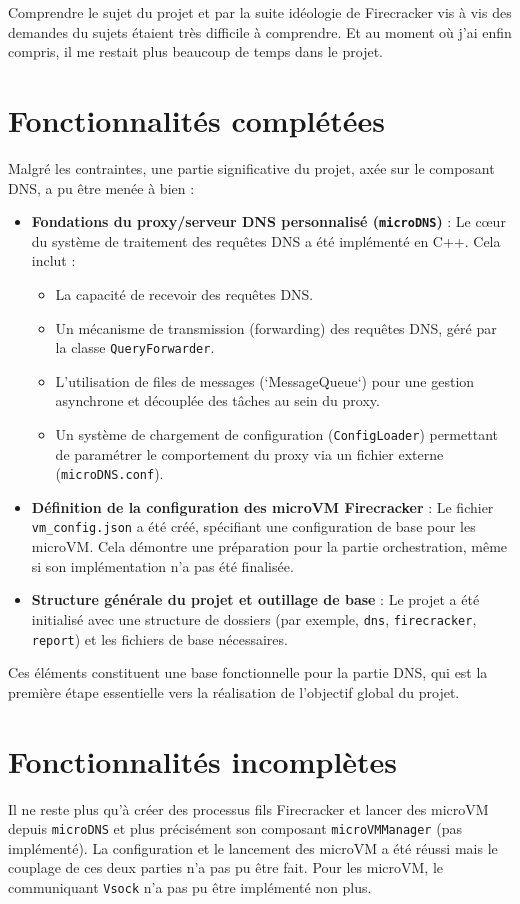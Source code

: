 \documentclass[12pt]{article}
\begin{document}
Comprendre le sujet du projet et par la suite idéologie de Firecracker vis à vis des demandes du sujets étaient très difficile à comprendre. Et au moment où j'ai enfin compris, il me restait plus beaucoup de temps dans le projet.

\section{Fonctionnalités complétées}
Malgré les contraintes, une partie significative du projet, axée sur le composant DNS, a pu être menée à bien :

\begin{itemize}
    \item \textbf{Fondations du proxy/serveur DNS personnalisé (\texttt{microDNS})} : Le cœur du système de traitement des requêtes DNS a été implémenté en C++. Cela inclut :
        \begin{itemize}
            \item La capacité de recevoir des requêtes DNS.
            \item Un mécanisme de transmission (forwarding) des requêtes DNS, géré par la classe \texttt{QueryForwarder}.
            \item L'utilisation de files de messages (`MessageQueue`) pour une gestion asynchrone et découplée des tâches au sein du proxy.
            \item Un système de chargement de configuration (\texttt{ConfigLoader}) permettant de paramétrer le comportement du proxy via un fichier externe (\texttt{microDNS.conf}).
        \end{itemize}
    \item \textbf{Définition de la configuration des microVM Firecracker} : Le fichier \texttt{vm\_config.json} a été créé, spécifiant une configuration de base pour les microVM. Cela démontre une préparation pour la partie orchestration, même si son implémentation n'a pas été finalisée.
    \item \textbf{Structure générale du projet et outillage de base} : Le projet a été initialisé avec une structure de dossiers (par exemple, \texttt{dns}, \texttt{firecracker}, \texttt{report}) et les fichiers de base nécessaires.
\end{itemize}
Ces éléments constituent une base fonctionnelle pour la partie DNS, qui est la première étape essentielle vers la réalisation de l'objectif global du projet.

\section{Fonctionnalités incomplètes}
Il ne reste plus qu'à créer des processus fils Firecracker et lancer des microVM depuis \texttt{microDNS} et plus précisément son composant \texttt{microVMManager} (pas implémenté). La configuration et le lancement des microVM a été réussi mais le couplage de ces deux parties n'a pas pu être fait. Pour les microVM, le communiquant \texttt{Vsock} n'a pas pu être implémenté non plus.
\end{document}
